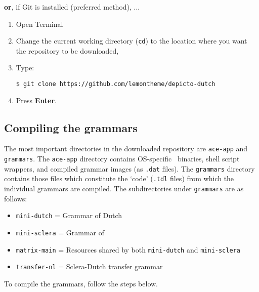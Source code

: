 \textbf{or}, if Git is installed (preferred method), ...

\begin{enumerate}
    \item Open Terminal
    \item Change the current working directory (\texttt{cd}) to the location
          where you want the repository to be downloaded,
    \item Type:
    \begin{verbatim}
$ git clone https://github.com/lemontheme/depicto-dutch
    \end{verbatim}
    \vspace{-0.5cm}
    \item Press \textbf{Enter}.
\end{enumerate}

\subsection*{Compiling the grammars}

The most important directories in the downloaded repository are
\texttt{ace-app} and \texttt{grammars}. The \texttt{ace-app} directory contains
OS-specific \ace\ binaries, shell script wrappers, and compiled grammar images
(as \texttt{.dat} files). The \texttt{grammars} directory contains those files
which constitute the `code' (\texttt{.tdl} files) from which the individual
grammars are compiled. The subdirectories under \texttt{grammars} are as
follows:

\begin{itemize}
    \item \texttt{mini-dutch}  = Grammar of Dutch
    \item \texttt{mini-sclera} = Grammar of \sclera
    \item \texttt{matrix-main} = Resources shared by both
                                 \texttt{mini-dutch} and \texttt{mini-sclera}
    \item \texttt{transfer-nl} = Sclera-Dutch transfer grammar
\end{itemize}

To compile the grammars, follow the steps below.

